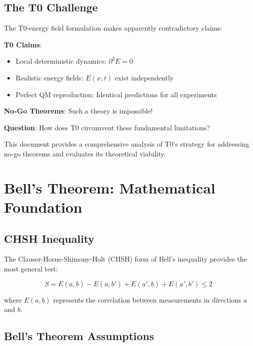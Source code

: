 \documentclass[12pt,a4paper]{article}
\newcommand{\Efield}{E}
\begin{document}
	\subsection{The T0 Challenge}
	
	The T0-energy field formulation makes apparently contradictory claims:
	
	\begin{tcolorbox}[colback=red!5!white,colframe=red!75!black,title=T0 Claims vs No-Go Theorems]
		\textbf{T0 Claims}:
		\begin{itemize}
			\item Local deterministic dynamics: $\partial^2 \Efield = 0$
			\item Realistic energy fields: $\Efield(x,t)$ exist independently
			\item Perfect QM reproduction: Identical predictions for all experiments
		\end{itemize}
		
		\textbf{No-Go Theorems}: Such a theory is impossible!
		
		\textbf{Question}: How does T0 circumvent these fundamental limitations?
	\end{tcolorbox}
	
	This document provides a comprehensive analysis of T0's strategy for addressing no-go theorems and evaluates its theoretical viability.
	
	\section{Bell's Theorem: Mathematical Foundation}
	
	\subsection{CHSH Inequality}
	
	The Clauser-Horne-Shimony-Holt (CHSH) form of Bell's inequality provides the most general test:
	
	\begin{equation}
		S = E(a,b) - E(a,b') + E(a',b) + E(a',b') \leq 2
		\label{eq:chsh_inequality}
	\end{equation}
	
	where $E(a,b)$ represents the correlation between measurements in directions $a$ and $b$.
	
	\subsection{Bell's Theorem Assumptions}
	
\end{document}
